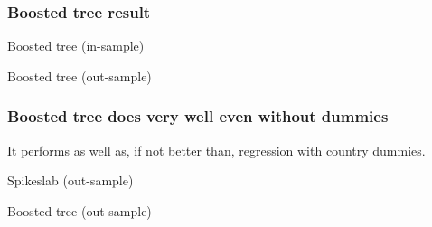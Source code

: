 \documentclass{beamer}
\begin{document}
\begin{frame}
\frametitle{Boosted tree result}
\begin{table}
	
	\caption{Boosted tree (in-sample)}
\end{table}
\begin{table}
	
	\caption{Boosted tree (out-sample)}
\end{table}
\end{frame}

\begin{frame}
\frametitle{Boosted tree does very well even without dummies}
It performs as well as, if not better than, regression with country dummies.
\begin{table}
	
	\caption{Spikeslab (out-sample)}
\end{table}
\begin{table}
	
	\caption{Boosted tree (out-sample)}
\end{table}
\end{frame}
\end{document}
